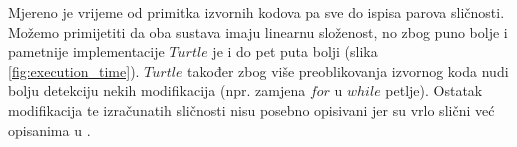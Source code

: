 \noindent Mjereno je vrijeme od primitka izvornih kodova pa sve do ispisa parova sličnosti. Možemo primijetiti da oba sustava imaju linearnu složenost, no zbog puno bolje i pametnije implementacije $Turtle$ je i do pet puta bolji (slika \ref{fig:execution_time}). $Turtle$ također zbog više preoblikovanja izvornog koda nudi bolju detekciju nekih modifikacija (npr. zamjena $for$ u $while$ petlje). Ostatak modifikacija te izračunatih sličnosti nisu posebno opisivani jer su vrlo slični već opisanima u \cite{plagijator}.
